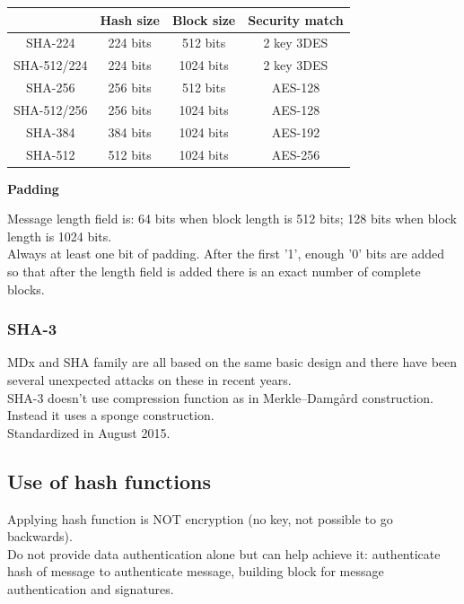 \documentclass{article}
\begin{document}
\begin{center}
\begin{tabular}{ | c | c | c | c | } 
\hline
 & Hash size & Block size & Security match \\
\hline
SHA-224 & 224 bits & 512 bits & 2 key 3DES \\ 
\hline
SHA-512/224 & 224 bits & 1024 bits & 2 key 3DES \\ 
\hline
SHA-256 & 256 bits & 512 bits & AES-128 \\ 
\hline
SHA-512/256 & 256 bits & 1024 bits & AES-128 \\ 
\hline
SHA-384 & 384 bits & 1024 bits & AES-192 \\ 
\hline
SHA-512 & 512 bits & 1024 bits & AES-256 \\ 
\hline
\end{tabular}
\end{center}

\textbf{Padding}

Message length field is: 64 bits when block length is 512 bits; 128 bits when block length is 1024 bits.\\
Always at least one bit of padding. After the first '1', enough '0' bits are added so that after the length field is added there is an exact number of complete blocks.\\

\subsubsection{SHA-3}

MDx and SHA family are all based on the same basic design and there have been several unexpected attacks on these in recent years.\\
SHA-3 doesn’t use compression function as in Merkle–Damgård construction. Instead it uses a sponge construction.\\
Standardized in August 2015.

\subsection{Use of hash functions}

Applying hash function is NOT encryption (no key, not possible to go backwards).\\
Do not provide data authentication alone but can help achieve it: authenticate hash of message to authenticate message, building block for message authentication and signatures.
\end{document}
